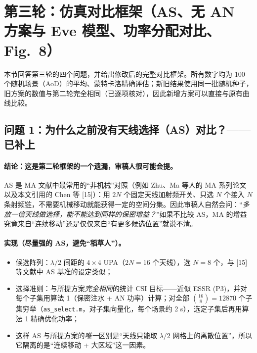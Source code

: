 \documentclass[11pt,a4paper]{ctexart}
\newcommand{\code}[1]{\texttt{#1}}
\begin{document}
\section{第三轮：仿真对比框架（AS、无 AN 方案与 Eve 模型、功率分配对比、Fig.~8）}
本节回答第三轮的四个问题，并给出修改后的完整对比框架。所有数字均为 100 个随机场景（AoD）的平均、蒙特卡洛精确评估；新旧结果使用同一批随机种子，旧方案的数值与第二轮完全相同（已逐项核对），因此新增方案可以直接与原有曲线比较。

\subsection{问题 1：为什么之前没有天线选择（AS）对比？——已补上}
\paragraph{结论：这是第二轮框架的一个遗漏，审稿人很可能会提。}
AS 是 MA 文献中最常用的“非机械”对照（例如 Zhu、Ma 等人的 MA 系列论文以及本文引用的 Chen 等 [15]）：用 $2N$ 个固定天线加射频开关、只选 $N$ 个接入 $N$ 条射频链，不需要机械移动就能获得一定的空间分集。因此审稿人自然会问：“\emph{多放一倍天线做选择，能不能达到同样的保密增益？}”如果不比较 AS，MA 的增益究竟来自“连续移动”还是仅仅来自“有更多候选位置”就说不清。

\paragraph{实现（尽量强的 AS，避免“稻草人”）。}
\begin{itemize}
\item 候选阵列：$\lambda/2$ 间距的 $4\times4$ UPA（$2N=16$ 个天线），选 $N=8$ 个，与 [15] 等文献中 AS 基准的设定类似；
\item 选择准则：与所提方案\emph{完全相同}的统计 CSI 目标——近似 ESSR (P3)，并对每个子集用算法 1（保密注水 + AN 功率）计算；对全部 $\binom{16}{8}=12870$ 个子集穷举（\code{as\_select.m}，对子集向量化，每个场景约 2 s），选定子集后再用算法 1 精确优化功率；
\item 这样 AS 与所提方案的\emph{唯一}区别是“天线只能取 $\lambda/2$ 网格上的离散位置”，所以它隔离的是“连续移动 + 大区域”这一因素。
\end{itemize}
\end{document}
